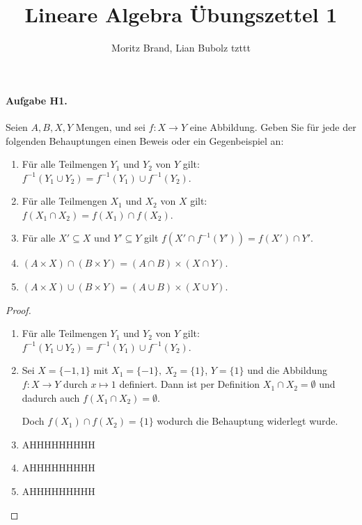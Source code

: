 \documentclass[12pt, letterpaper]{article}
\title{Lineare Algebra Übungszettel 1}
\author{Moritz Brand, Lian Bubolz tzttt}
\date{}
\begin{document}
\maketitle
\paragraph{Aufgabe H1.}

Seien $A, B, X, Y$ Mengen, und sei $f : X \to  Y$ eine Abbildung. 
Geben Sie für jede der folgenden Behauptungen einen Beweis oder ein Gegenbeispiel an:

\begin{enumerate}

    \item Für alle Teilmengen $Y_1$ und $Y_2$ von $Y$ gilt: 
        $f^{-1}(Y_1 \cup Y_2) = f^{-1}(Y_1) \cup f^{-1}(Y_2)$.

    \item Für alle Teilmengen $X_1$ und $X_2$ von $X$ gilt: 
        $f(X_1 \cap X_2) = f(X_1) \cap  f(X_2)$.

    \item Für alle $X'\subseteq X$ und $Y'\subseteq Y$ gilt $f(X' \cap f^{-1}(Y')) = f(X') \cap Y'$.
    \item $(A \times X) \cap (B \times Y) = (A \cap B) \times (X \cap Y)$. 
    \item $(A \times X) \cup (B \times Y) = (A \cup B) \times (X \cup Y)$. 

\end{enumerate} 
 
\begin{proof}
    \hspace*{10mm} \par

    \begin{enumerate}

        

        \item Für alle Teilmengen $Y_1$ und $Y_2$ von $Y$ gilt: 
            $f^{-1}(Y_1 \cup Y_2) = f^{-1}(Y_1) \cup f^{-1}(Y_2)$.

        \item Sei $X = \{-1,1\}$ mit $X_1 = \{-1\}, \ X_2=\{1\}$, $Y = \{1\}$ und die Abbildung $f : X \to  Y$ durch $x\mapsto 1$ definiert.
        Dann ist per Definition $X_1 \cap X_2 = \emptyset$ und dadurch auch $f(X_1 \cap X_2) = \emptyset$. 
        
        Doch $f(X_1) \cap  f(X_2) = \{1\}$ wodurch die Behauptung widerlegt wurde.

        \item AHHHHHHHHH
        \item AHHHHHHHHH
        \item AHHHHHHHHH
    \end{enumerate} 

\end{proof} 
\end{document}
